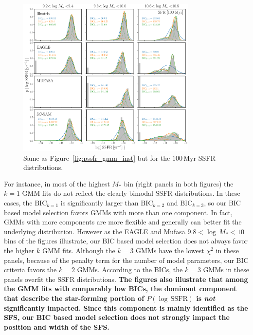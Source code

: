 \documentclass[tighten, preprint]{aastex62}
\begin{document}
\begin{figure}
\begin{center}
\includegraphics[width=0.8\textwidth]{Pssfr_GMMcomps_100myr.pdf} 
\caption{Same as Figure~\ref{fig:pssfr_gmm_inst} but for the $100\,\mathrm{Myr}$
SSFR distributions.} 
\label{fig:pssfr_gmm_100myr}
\end{center}
\end{figure}
For instance, in most of the highest $M_*$ bin (right panels in both figures) 
the $k=1$ GMM fits do not reflect the clearly bimodal SSFR distributions.
In these cases, the $\mathrm{BIC}_{k=1}$ is significantly larger than
$\mathrm{BIC}_{k=2}$ and $\mathrm{BIC}_{k=3}$, so our BIC based model 
selection favors GMMs with more than one component. In fact, GMMs with
more components are more flexible and generally can better fit the underlying 
distribution. However as the EAGLE and {\sc Mufasa} $9.8 <\log\,M_*<10$ 
bins of the figures illustrate, our BIC based model selection does not 
always favor the higher $k$ GMM fits. Although the $k=3$ GMMs have the 
lowest $\chi^2$ in these panels, because of the penalty term for the 
number of model parameters, our BIC criteria favors the $k=2$ GMMs.
According to the BICs, the $k=3$ GMMs in these panels overfit the 
SSFR distributions.
{\bf \color{red} 
The figures also illustrate that among the GMM fits with comparably 
low BICs, the dominant component that describe the star-forming portion 
of $P(\log\,\mathrm{SSFR})$ is {\em not} significantly impacted. Since 
this component is mainly identified as the SFS, our BIC based model
selection does not strongly impact the position and width of the SFS.  
}
\end{document}
